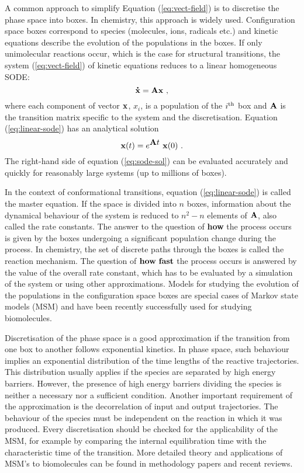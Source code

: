 A common approach to simplify Equation (\ref{eq:vect-field}) is to discretise the phase space into boxes.
In chemistry, this approach is widely used.
Configuration space boxes correspond to species (molecules, ions, radicals etc.) and kinetic equations describe the evolution of the populations in the boxes.
If only unimolecular reactions occur, which is the case for structural transitions, the system (\ref{eq:vect-field}) of kinetic equations reduces to a linear homogeneous SODE:
\begin{equation}
\label{eq:linear-sode}
\accentset{\mbox{\large\bfseries .}}{\bf x} = {\bf A} {\bf x} ~,
\end{equation}
where each component of vector ${\bf x}$, $x_i$, is a population of the $i^{\rm th}$ box and ${\bf A}$ is the transition matrix specific to the system and the discretisation.
Equation (\ref{eq:linear-sode}) has an analytical solution
\begin{equation}
\label{eq:sode-sol}
{\bf x}(t) = e^{\displaystyle{\bf A} t} ~ {\bf x}(0) ~.
\end{equation}
The right-hand side of equation (\ref{eq:sode-sol}) can be evaluated accurately and quickly for reasonably large systems (up to millions of boxes).

In the context of conformational transitions, equation (\ref{eq:linear-sode}) is called the master equation.\cite{Gillespie1992, Pande2010b}
If the space is divided into $n$ boxes, information about the dynamical behaviour of the system is reduced to $n^2-n$ elements of ${\bf A}$, also called the rate constants.
The answer to the question of {\bf how} the process occurs is given by the boxes undergoing a significant population change during the process.
In chemistry, the set of discrete paths through the boxes is called the reaction mechanism.
The question of ${\bf how ~ fast}$ the process occurs is answered by the value of the overall rate constant, which has to be evaluated by a simulation of the system or using other approximations.
Models for studying the evolution of the populations in the configuration space boxes are special cases of Markov state models (MSM) and have been recently successfully used for studying biomolecules.
\cite{Kasson2006, Kelley2008}

Discretisation of the phase space is a good approximation if the transition from one box to another follows exponential kinetics.
In phase space, such behaviour implies an exponential distribution of the time lengths of the reactive trajectories.
This distribution usually applies if the species are separated by high energy barriers.
However, the presence of high energy barriers dividing the species is neither a necessary nor a sufficient condition.
Another important requirement of the approximation is the decorrelation of input and output trajectories.
The behaviour of the species must be independent on the reaction in which it was produced.\cite{vanKampen1992}
Every discretisation should be checked for the applicability of the MSM,\cite{Chodera2006b} for example by comparing the internal equilibration time\cite{Chodera2007} with the characteristic time of the transition.
More detailed theory and applications of MSM's to biomolecules can be found in methodology papers\cite{Chodera2006a, Noe2008, Bowman2009a} and recent reviews.\cite{Bowman2009b, Pande2010b}


